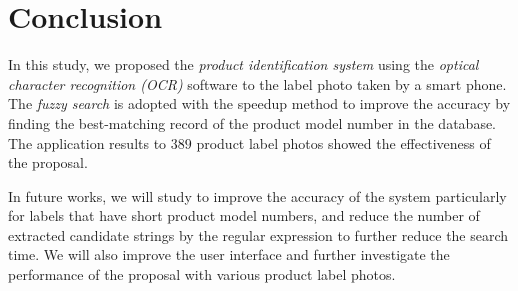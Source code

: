 \documentclass[technicalreport]{ieicej}
\begin{document}
               
\section{Conclusion}
\label{sec:conclusion}
    In this study, we proposed the {\em product identification system} using the {\em optical character recognition (OCR)} software to the label photo taken by a smart phone. The {\em fuzzy search} is adopted with the speedup method to improve the accuracy by finding the best-matching record of the product model number in the database. The application results to $389$ product label photos showed the effectiveness of the proposal. 

    In future works, we will study to improve the accuracy of the system particularly for labels that have short product model numbers, and reduce the number of extracted candidate strings by the regular expression to further reduce the search time. We will also improve the user interface and further investigate the performance of the proposal with various product label photos.
\end{document}
